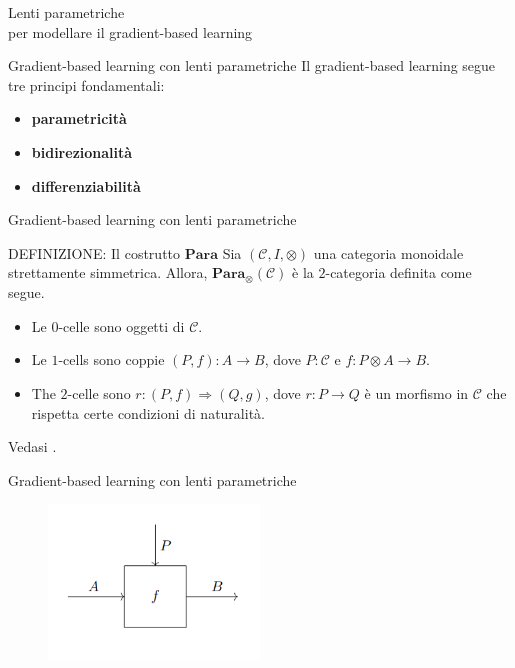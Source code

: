 \documentclass{beamer}
\begin{document}
\begin{frame}[standout]
    \huge Lenti parametriche \\\large per modellare il gradient-based learning
\end{frame}

\begin{frame}{Gradient-based learning con lenti parametriche}
    Il gradient-based learning segue tre principi fondamentali:
    \begin{itemize}
        \item<1-> \textbf{parametricità}
        \item<2-> \textbf{bidirezionalità}
        \item<3-> \textbf{differenziabilità}
    \end{itemize}
\end{frame}

\begin{frame}{Gradient-based learning con lenti parametriche}
    \begin{block}{DEFINIZIONE: Il costrutto $\mathbf{Para}$}
        Sia $(\mathcal{C},I,\otimes)$ una categoria monoidale strettamente simmetrica. Allora, $\mathbf{Para}_{\otimes}(\mathcal{C})$ è la $2$-categoria definita come segue.
        \begin{itemize}
          \item Le $0$-celle sono oggetti di $\mathcal{C}$.
          \item Le $1$-cells sono coppie $(P,f): A \to B$, dove $P : \mathcal{C}$ e $f: P \otimes A \to B$.
          \item The $2$-celle sono $r: (P,f) \Rightarrow (Q,g)$, dove $r: P \to Q$ è un morfismo in $\mathcal{C}$ che rispetta certe condizioni di naturalità.
        \end{itemize}
        Vedasi \cite{gavranovic2024fundamental}.
      \end{block}
\end{frame}

\begin{frame}{Gradient-based learning con lenti parametriche}
    \begin{figure}
        \begin{center}
            \includegraphics[width=0.5\textwidth]{figures/para.png}
            \caption*{\cite{gavranovic2024fundamental}}
        \end{center}
    \end{figure}
\end{frame}
\end{document}
